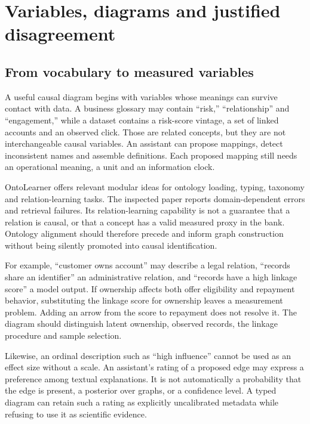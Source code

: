 \chapter{Variables, diagrams and justified disagreement}
\label{la:diagrams}

\section{From vocabulary to measured variables}

A useful causal diagram begins with variables whose meanings can survive
contact with data. A business glossary may contain ``risk,'' ``relationship''
and ``engagement,'' while a dataset contains a risk-score vintage, a set of
linked accounts and an observed click. Those are related concepts, but they
are not interchangeable causal variables. An assistant can propose mappings,
detect inconsistent names and assemble definitions. Each proposed mapping
still needs an operational meaning, a unit and an information clock.

OntoLearner offers relevant modular ideas for ontology loading, typing,
taxonomy and relation-learning tasks. The inspected paper reports
domain-dependent errors and retrieval failures. Its relation-learning
capability is not a guarantee that a relation is causal, or that a concept
has a valid measured proxy in the bank. Ontology alignment should therefore
precede and inform graph construction without being silently promoted into
causal identification.\cite{v12_la_2607_01977}

For example, ``customer owns account'' may describe a legal relation,
``records share an identifier'' an administrative relation, and ``records
have a high linkage score'' a model output. If ownership affects both offer
eligibility and repayment behavior, substituting the linkage score for
ownership leaves a measurement problem. Adding an arrow from the score to
repayment does not resolve it. The diagram should distinguish latent
ownership, observed records, the linkage procedure and sample selection.

Likewise, an ordinal description such as ``high influence'' cannot be used
as an effect size without a scale. An assistant's rating of a proposed edge
may express a preference among textual explanations. It is not automatically
a probability that the edge is present, a posterior over graphs, or a
confidence level. A typed diagram can retain such a rating as explicitly
uncalibrated metadata while refusing to use it as scientific evidence.

